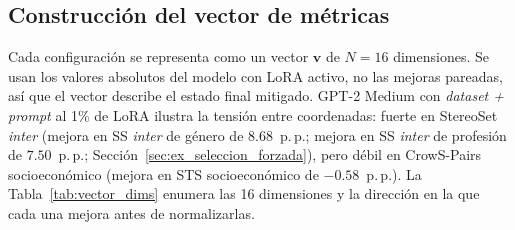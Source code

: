 \documentclass[12pt,a4paper]{report}
\newcommand{\vconfig}{\ensuremath{\mathbf{v}}}
\newcommand{\ndim}{\ensuremath{N}}
\begin{document}
\subsection{Construcción del vector de métricas}
\label{subsec:ex_vector}
\label{subsec:ex_vector_construccion}

Cada configuración se representa como un vector \vconfig{} de $\ndim=16$ dimensiones. Se usan los valores absolutos del modelo con LoRA activo, no las mejoras pareadas, así que el vector describe el estado final mitigado. GPT-2 Medium con \textit{dataset + prompt} al 1\% de LoRA ilustra la tensión entre coordenadas: fuerte en StereoSet \textit{inter} (mejora en SS \textit{inter} de género de $8.68$~p.\,p.; mejora en SS \textit{inter} de profesión de $7.50$~p.\,p.; Sección~\ref{sec:ex_seleccion_forzada}), pero débil en CrowS-Pairs socioeconómico (mejora en STS socioeconómico de $-0.58$~p.\,p.). La Tabla~\ref{tab:vector_dims} enumera las 16 dimensiones y la dirección en la que cada una mejora antes de normalizarlas.
\end{document}
